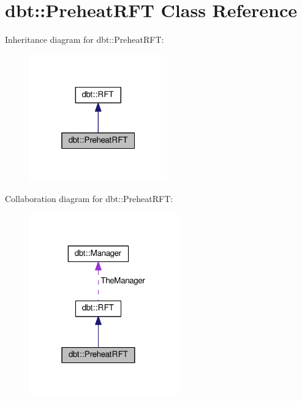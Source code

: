 \hypertarget{classdbt_1_1_preheat_r_f_t}{}\section{dbt\+:\+:Preheat\+R\+FT Class Reference}
\label{classdbt_1_1_preheat_r_f_t}


Inheritance diagram for dbt\+:\+:Preheat\+R\+FT\+:\nopagebreak
\begin{figure}[H]
\begin{center}
\leavevmode
\includegraphics[width=169pt]{classdbt_1_1_preheat_r_f_t__inherit__graph}
\end{center}
\end{figure}


Collaboration diagram for dbt\+:\+:Preheat\+R\+FT\+:\nopagebreak
\begin{figure}[H]
\begin{center}
\leavevmode
\includegraphics[width=183pt]{classdbt_1_1_preheat_r_f_t__coll__graph}
\end{center}
\end{figure}
